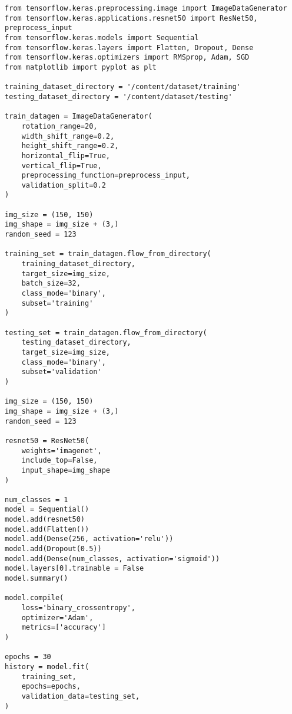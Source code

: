 \begin{verbatim}
from tensorflow.keras.preprocessing.image import ImageDataGenerator
from tensorflow.keras.applications.resnet50 import ResNet50, preprocess_input
from tensorflow.keras.models import Sequential
from tensorflow.keras.layers import Flatten, Dropout, Dense
from tensorflow.keras.optimizers import RMSprop, Adam, SGD
from matplotlib import pyplot as plt

training_dataset_directory = '/content/dataset/training'
testing_dataset_directory = '/content/dataset/testing'

train_datagen = ImageDataGenerator(
    rotation_range=20,
    width_shift_range=0.2,
    height_shift_range=0.2,
    horizontal_flip=True,
    vertical_flip=True,
    preprocessing_function=preprocess_input,
    validation_split=0.2
)

img_size = (150, 150)
img_shape = img_size + (3,)
random_seed = 123

training_set = train_datagen.flow_from_directory(
    training_dataset_directory,
    target_size=img_size,
    batch_size=32,
    class_mode='binary',
    subset='training'
)

testing_set = train_datagen.flow_from_directory(
    testing_dataset_directory,
    target_size=img_size,
    class_mode='binary',
    subset='validation'
)

img_size = (150, 150)
img_shape = img_size + (3,)
random_seed = 123

resnet50 = ResNet50(
    weights='imagenet',
    include_top=False,
    input_shape=img_shape
)

num_classes = 1
model = Sequential()
model.add(resnet50)
model.add(Flatten())
model.add(Dense(256, activation='relu'))
model.add(Dropout(0.5))
model.add(Dense(num_classes, activation='sigmoid'))
model.layers[0].trainable = False
model.summary()

model.compile(
    loss='binary_crossentropy',
    optimizer='Adam',
    metrics=['accuracy']
)

epochs = 30
history = model.fit(
    training_set,
    epochs=epochs,
    validation_data=testing_set,
)
\end{verbatim}
